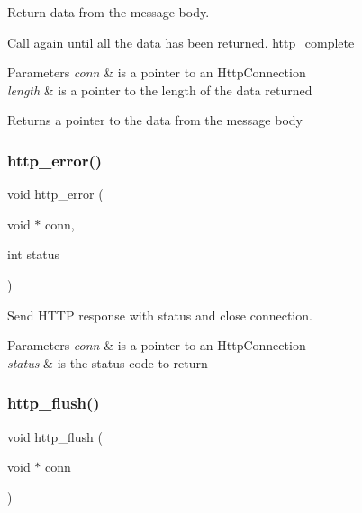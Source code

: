 Return data from the message body. 

Call again until all the data has been returned. \hyperlink{group__http__connection_ga840e20735c835fbd29956a2d82b5ef71}{http\+\_\+complete}


\begin{DoxyParams}{Parameters}
{\em conn} & is a pointer to an Http\+Connection \\
\hline
{\em length} & is a pointer to the length of the data returned \\
\hline
\end{DoxyParams}
\begin{DoxyReturn}{Returns}
a pointer to the data from the message body 
\end{DoxyReturn}
\mbox{\label{group__http__connection_gac4613339c6810e44f79f8c4942ae9f6c}} 
\subsubsection{\texorpdfstring{http\+\_\+error()}{http\_error()}}
{\footnotesize\ttfamily void http\+\_\+error (\begin{DoxyParamCaption}\item[{void $\ast$}]{conn,  }\item[{int}]{status }\end{DoxyParamCaption})}



Send H\+T\+TP response with status and close connection. 


\begin{DoxyParams}{Parameters}
{\em conn} & is a pointer to an Http\+Connection \\
\hline
{\em status} & is the status code to return \\
\hline
\end{DoxyParams}
\mbox{\label{group__http__connection_ga219c5661faaf31ba853fc7a4f4aaac07}} 
\subsubsection{\texorpdfstring{http\+\_\+flush()}{http\_flush()}}
{\footnotesize\ttfamily void http\+\_\+flush (\begin{DoxyParamCaption}\item[{void $\ast$}]{conn }\end{DoxyParamCaption})}




